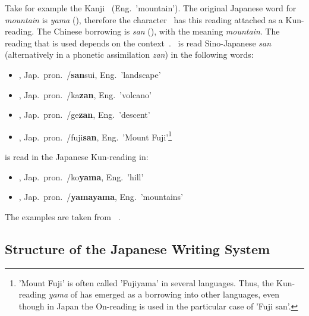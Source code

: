 Take for example the Kanji ~(Eng.\ 'mountain'). 
The original Japanese word for \emph{mountain} is \emph{yama} (),
therefore the character ~has this reading attached as a Kun-reading.
The Chinese borrowing is \emph{san} (), with the meaning 
\emph{mountain}. The reading that is used depends on the 
context~.
~is read Sino-Japanese \emph{san} (alternatively in a phonetic 
assimilation \emph{zan}) in the following words:
\begin{itemize}
  \item {}, Jap.\ pron.\ /\textbf{san}sui, Eng.\ 'landscape'
  \item {}, Jap.\ pron.\ /ka\textbf{zan}, Eng.\ 'volcano'
  \item {}, Jap.\ pron.\ /ge\textbf{zan}, Eng.\ 'descent'
  \item {}, Jap.\ pron.\ /fuji\textbf{san}, Eng.\ 
        'Mount Fuji'\footnote{'Mount Fuji' is often called 'Fujiyama' in 
        several languages. Thus, the Kun-reading \emph{yama} of \cjk{山} has 
        emerged as a borrowing into other languages, even though in Japan 
        the On-reading is used in the particular case of 'Fuji san'.}
\end{itemize}
 is read in the Japanese Kun-reading in:
\begin{itemize}
  \item {}, Jap.\ pron.\ /ko\textbf{yama}, Eng.\ 'hill'
  \item \cjk{山山}, Jap.\ pron.\ \cjk{ヤマヤマ}/\textbf{yamayama}, Eng.\ 'mountains'
\end{itemize}
The examples are taken from 
~\citeyear{Hadamitzky1995}.

\subsection{Structure of the Japanese Writing System}
\label{sec:structureofwritingsystem}

